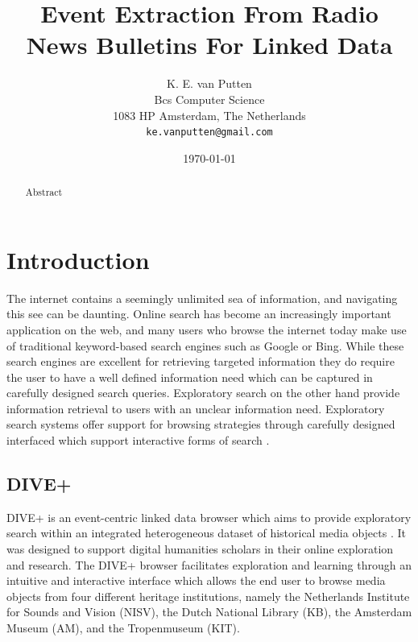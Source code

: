 \documentclass[a4paper, 10pt, conference]{ieeeconf}      %
\title{\LARGE \bf
Event Extraction From Radio News Bulletins For Linked Data
}
\author{ \parbox{3 in}{\centering K. E. van Putten\\
         Bcs Computer Science\\
         1083 HP Amsterdam, The Netherlands\\
         {\tt\small ke.vanputten@gmail.com}}
         \hspace*{ 0.5 in}
}
\begin{document}
\date{\today}
\maketitle
\pagestyle{plain}


\begin{abstract}

Abstract

\end{abstract}



\section{Introduction}
The internet contains a seemingly unlimited sea of information, and navigating this see can be daunting. Online search has become an increasingly important application on the web, and many users who browse the internet today make use of traditional keyword-based search engines such as Google or Bing. While these search engines are excellent for retrieving targeted information they do require the user to have a well defined information need which can be captured in carefully designed search queries. Exploratory search on the other hand provide information retrieval to users with an unclear information need. Exploratory search systems offer support for browsing strategies through carefully designed interfaced which support interactive forms of search \cite{marchionini2006exploratory}.

\subsection{DIVE+}

DIVE+ is an event-centric linked data browser which aims to provide exploratory search within an integrated heterogeneous dataset of historical media objects \cite{de2015dive}. It was designed to support digital humanities scholars in their online exploration and research. The DIVE+ browser facilitates exploration and learning through an intuitive and interactive interface which allows the end user to browse media objects from four different heritage institutions, namely the Netherlands Institute for Sounds and Vision (NISV), the Dutch National Library (KB), the Amsterdam Museum (AM), and the Tropenmuseum (KIT).\cite{ineldive+}  
\end{document}
